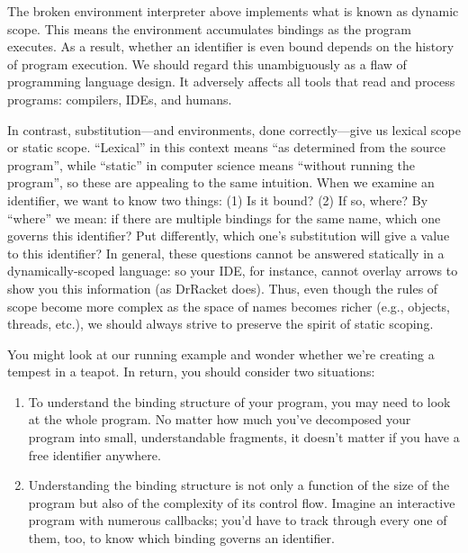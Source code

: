 
The broken environment interpreter above implements what is known as dynamic
scope. This means the environment accumulates bindings as the program executes.
As a result, whether an identifier is even bound depends on the history of
program execution. We should regard this unambiguously as a flaw of programming
language design. It adversely affects all tools that read and process programs:
compilers, IDEs, and humans.

In contrast, substitution—and environments, done correctly—give us lexical scope
or static scope. “Lexical” in this context means “as determined from the source program”, while “static” in computer science means “without running the program”, so these are appealing to the same intuition. When we examine an identifier, we want to know two things: (1) Is it bound? (2) If so, where? By “where” we mean: if there are multiple bindings for the same name, which one governs this identifier? Put differently, which one’s substitution will give a value to this identifier? In general, these questions cannot be answered statically in a dynamically-scoped language: so your IDE, for instance, 
cannot overlay arrows to show you this information (as DrRacket does).
Thus, even though the rules of scope become more complex as the space of names
becomes richer (e.g., objects, threads, etc.), we should always strive to preserve the spirit of static 
scoping.

\secdown
{}

You might look at our running example and wonder whether we’re creating a
tempest in a teapot. In return, you should consider two situations:
\begin{enumerate}

\item To understand the binding structure of your program, you may need to look
at the whole program. No matter how much you’ve decomposed your program into
small, understandable fragments, it doesn’t matter if you have a free identifier
anywhere.

\item Understanding the binding structure is not only a function of the size of
the program but also of the complexity of its control flow. Imagine an
interactive program with numerous callbacks; you’d have to track through every
one of them, too, to know which binding governs an identifier.

\end{enumerate}

